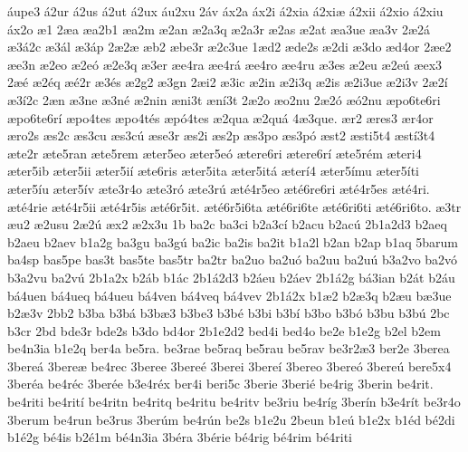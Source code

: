 {^^e1upe3
^^e12ur
^^e12us
^^e12ut
^^e12ux
^^e1u2xu
2^^e1v
^^e1x2a
^^e1x2i
^^e12xia
^^e12xi^^e6
^^e12xii
^^e12xio
^^e12xiu
^^e1x2o
^^e61
2^^e6a
^^e6a2b1
^^e6a2m
^^e62an
^^e62a3q
^^e62a3r
^^e62as
^^e62at
^^e6a3ue
^^e6a3v
2^^e62^^e1
^^e63^^e12c
^^e63^^e1l
^^e63^^e1p
2^^e62^^e6
^^e6b2
^^e6be3r
^^e62c3ue
1^^e6d2
^^e6de2s
^^e62di
^^e63do
^^e6d4or
2^^e6e2
^^e6e3n
^^e62eo
^^e62e^^f3
^^e62e3q
^^e63er
^^e6e4ra
^^e6e4r^^e1
^^e6e4ro
^^e6e4ru
^^e63es
^^e62eu
^^e62e^^fa
^^e6ex3
2^^e6^^e9
^^e62^^e9q
^^e6^^e92r
^^e63^^e9s
^^e62g2
^^e63gn
2^^e6i2
^^e63ic
^^e62in
^^e62i3q
^^e62is
^^e62i3ue
^^e62i3v
2^^e62^^ed
^^e63^^ed2c
2^^e6n
^^e63ne
^^e63n^^e9
^^e62nin
^^e6ni3t
^^e6n^^ed3t
2^^e62o
^^e6o2nu
2^^e62^^f3
^^e6^^f32nu
^^e6po6te6ri
^^e6po6te6r^^ed
^^e6po4tes
^^e6po4t^^e9s
^^e6p^^f34tes
^^e62qua
^^e62qu^^e1
4^^e63que.
^^e6r2
^^e6res3
^^e6r4or
^^e6ro2s
^^e6s2c
^^e6s3cu
^^e6s3c^^fa
^^e6se3r
^^e6s2i
^^e6s2p
^^e6s3po
^^e6s3p^^f3
^^e6st2
^^e6sti5t4
^^e6st^^ed3t4
^^e6te2r
^^e6te5ran
^^e6te5rem
^^e6ter5eo
^^e6ter5e^^f3
^^e6tere6ri
^^e6tere6r^^ed
^^e6te5r^^e9m
^^e6teri4
^^e6ter5ib
^^e6ter5ii
^^e6ter5i^^ed
^^e6te6ris
^^e6ter5ita
^^e6ter5it^^e1
^^e6ter^^ed4
^^e6ter5^^edmu
^^e6ter5^^edti
^^e6ter5^^edu
^^e6ter5^^edv
^^e6te3r4o
^^e6te3r^^f3
^^e6te3r^^fa
^^e6t^^e94r5eo
^^e6t^^e96re6ri
^^e6t^^e94r5es
^^e6t^^e94ri.
^^e6t^^e94rie
^^e6t^^e94r5ii
^^e6t^^e94r5is
^^e6t^^e96r5it.
^^e6t^^e96r5i6ta
^^e6t^^e96ri6te
^^e6t^^e96ri6ti
^^e6t^^e96ri6to.
^^e63tr
^^e6u2
^^e62usu
2^^e62^^fa
^^e6x2
^^e62x3u
1b
ba2c
ba3ci
b2a3c^^ed
b2acu
b2ac^^fa
2b1a2d3
b2aeq
b2aeu
b2aev
b1a2g
ba3gu
ba3g^^fa
ba2ic
ba2is
ba2it
b1a2l
b2an
b2ap
b1aq
5barum
ba4sp
bas5pe
bas3t
bas5te
bas5tr
ba2tr
ba2uo
ba2u^^f3
ba2uu
ba2u^^fa
b3a2vo
ba2v^^f3
b3a2vu
ba2v^^fa
2b1a2x
b2^^e1b
b1^^e1c
2b1^^e12d3
b2^^e1eu
b2^^e1ev
2b1^^e12g
b^^e13ian
b2^^e1t
b2^^e1u
b^^e14uen
b^^e14ueq
b^^e14ueu
b^^e14ven
b^^e14veq
b^^e14vev
2b1^^e12x
b1^^e62
b2^^e63q
b2^^e6u
b^^e63ue
b2^^e63v
2bb2
b3ba
b3b^^e1
b3b^^e63
b3be3
b3b^^e9
b3bi
b3b^^ed
b3bo
b3b^^f3
b3bu
b3b^^fa
2bc
b3cr
2bd
bde3r
bde2s
b3do
bd4or
2b1e2d2
bed4i
bed4o
be2e
b1e2g
b2el
b2em
be4n3ia
b1e2q
ber4a
be5ra.
be3rae
be5raq
be5rau
be5rav
be3r2^^e63
ber2e
3berea
3bere^^e1
3bere^^e6
be4rec
3beree
3bere^^e9
3berei
3bere^^ed
3bereo
3bere^^f3
3bere^^fa
bere5x4
3ber^^e9a
be4r^^e9c
3ber^^e9e
b3e4r^^e9x
ber4i
beri5c
3berie
3beri^^e9
be4rig
3berin
be4rit.
be4riti
be4rit^^ed
be4ritn
be4ritq
be4ritu
be4ritv
be3riu
be4r^^edg
3ber^^edn
b3e4r^^edt
be3r4o
3berum
be4run
be3rus
3ber^^fam
be4r^^fan
be2s
b1e2u
2beun
b1e^^fa
b1e2x
b1^^e9d
b^^e92di
b1^^e92g
b^^e94is
b2^^e91m
b^^e94n3ia
3b^^e9ra
3b^^e9rie
b^^e94rig
b^^e94rim
b^^e94riti
}

